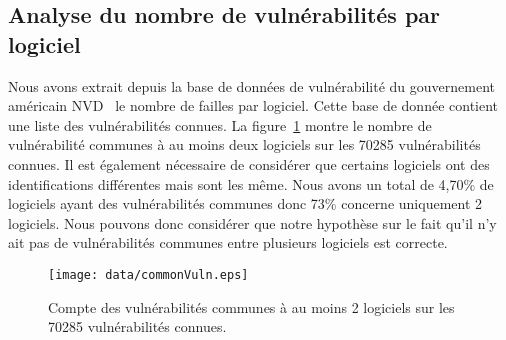 \subsection{Analyse du nombre de vulnérabilités par logiciel}
Nous avons extrait depuis la base de données de vulnérabilité du gouvernement américain NVD~\cite{vulnDatabase} le nombre de failles par logiciel.
Cette base de donnée contient une liste des vulnérabilités connues.
La figure~\ref{fig:vulPerLog} montre le nombre de vulnérabilité communes à au moins deux logiciels sur les 70285 vulnérabilités connues.
Il est également nécessaire de considérer que certains logiciels ont des identifications différentes mais sont les même.
Nous avons un total de 4,70\% de logiciels ayant des vulnérabilités communes donc 73\% concerne uniquement 2 logiciels.
Nous pouvons donc considérer que notre hypothèse sur le fait qu'il n'y ait pas de vulnérabilités communes entre plusieurs logiciels est correcte.

\begin{figure}
\texttt{[image: data/commonVuln.eps]}
\caption{Compte des vulnérabilités communes à au moins 2 logiciels sur les 70285 vulnérabilités connues.}
\label{fig:vulPerLog}
\end{figure}

